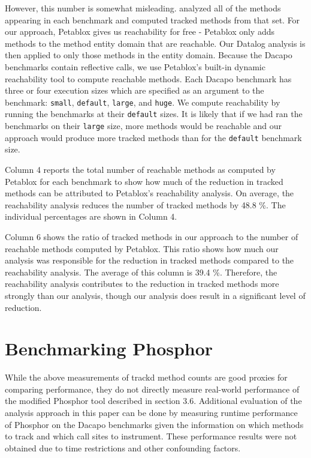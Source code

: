 However, this number is somewhat misleading. \cite{manoj_project}
analyzed all of the methods appearing in each benchmark and computed
tracked methods from that set. For our approach, Petablox gives us
reachability for free - Petablox only adds methods to the method
entity domain that are reachable. Our Datalog analysis is then applied
to only those methods in the entity domain. Because the Dacapo
benchmarks contain reflective calls, we use Petablox's built-in
dynamic reachability tool to compute reachable methods. Each Dacapo
benchmark has three or four execution sizes which are specified as an
argument to the benchmark: \texttt{small}, \texttt{default},
\texttt{large}, and \texttt{huge}. We compute reachability by running
the benchmarks at their \texttt{default} sizes. It is likely that if
we had ran the benchmarks on their \texttt{large} size, more methods
would be reachable and our approach would produce more tracked methods
than for the \texttt{default} benchmark size.

Column 4 reports the total number of reachable methods as computed by
Petablox for each benchmark to show how much of the reduction in
tracked methods can be attributed to Petablox's reachability
analysis. On average, the reachability analysis reduces the number of
tracked methods by 48.8 \%. The individual percentages are shown in
Column 4.

Column 6 shows the ratio of tracked methods in our approach to the
number of reachable methods computed by Petablox. This ratio shows how
much our analysis was responsible for the reduction in tracked methods
compared to the reachability analysis. The average of this column is
39.4 \%. Therefore, the reachability analysis contributes to the
reduction in tracked methods more strongly than our analysis, though
our analysis does result in a significant level of reduction.

\section{Benchmarking Phosphor}
While the above measurements of trackd method counts are good proxies
for comparing performance, they do not directly measure real-world
performance of the modified Phosphor tool described in section
3.6. Additional evaluation of the analysis approach in this paper can
be done by measuring runtime performance of Phosphor on the Dacapo
benchmarks given the information on which methods to track and which
call sites to instrument. These performance results were not obtained
due to time restrictions and other confounding factors.
